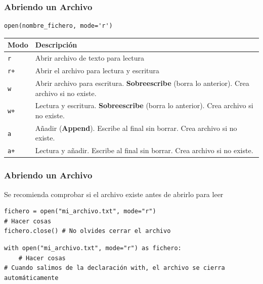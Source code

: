 \documentclass[11pt]{beamer}
\begin{document}
\begin{frame}[fragile]\frametitle{Abriendo un Archivo}
\begin{lstlisting}[basicstyle=\small]
open(nombre_fichero, mode='r')
\end{lstlisting}
\small
\begin{tabularx}{\textwidth}{lX}
\toprule
\textbf{Modo} & \textbf{Descripción} \\ 
\midrule
\texttt{r}    & Abrir archivo de texto para lectura \\
\texttt{r+}   & Abrir el archivo para lectura y escritura \\
\texttt{w}    & Abrir archivo para escritura. \textbf{Sobreescribe} (borra lo anterior). Crea archivo si no existe. \\
\texttt{w+}   & Lectura y escritura. \textbf{Sobreescribe} (borra lo anterior). Crea archivo si no existe. \\
\texttt{a}    & Añadir (\textbf{Append}). Escribe al final sin borrar. Crea archivo si no existe. \\
\texttt{a+}   & Lectura y añadir. Escribe al final sin borrar. Crea archivo si no existe. \\
\bottomrule
\end{tabularx}
\end{frame}


\begin{frame}[fragile]\frametitle{Abriendo un Archivo}
\begin{block}{}
\centering Se recomienda comprobar si el archivo existe antes de abrirlo para leer
\end{block}
\begin{lstlisting}[basicstyle=\small]
fichero = open("mi_archivo.txt", mode="r")
# Hacer cosas
fichero.close() # No olvides cerrar el archivo
\end{lstlisting}
\begin{lstlisting}[basicstyle=\small]
with open("mi_archivo.txt", mode="r") as fichero:
    # Hacer cosas
# Cuando salimos de la declaración with, el archivo se cierra automáticamente
\end{lstlisting}
\end{frame}
\end{document}

